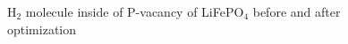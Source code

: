 \begin{figure}[h]
\begin{minipage}[h]{0.48\linewidth}
\end{minipage}
\hfill
\begin{minipage}[h]{0.48\linewidth}
\end{minipage}
\caption{H$_2$ molecule inside of P-vacancy of LiFePO$_4$ before and after optimization}
\label{h2}
\end{figure}

